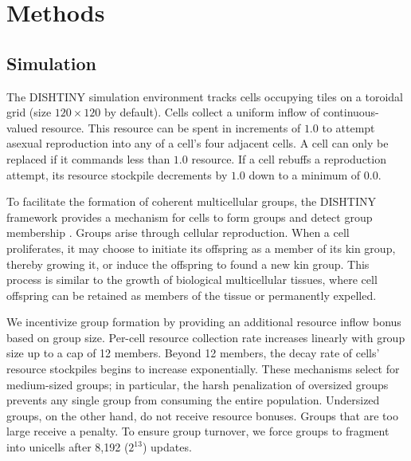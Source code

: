 



\section{Methods} \label{sec:methods;ch:measuring-cna}

\subsection{Simulation}



The DISHTINY simulation environment tracks cells occupying tiles on a toroidal grid (size $120\times120$ by default).
Cells collect a uniform inflow of continuous-valued resource.
This resource can be spent in increments of $1.0$ to attempt asexual reproduction into any of a cell's four adjacent cells.
A cell can only be replaced if it commands less than $1.0$ resource.
If a cell rebuffs a reproduction attempt, its resource stockpile decrements by $1.0$ down to a minimum of $0.0$.

To facilitate the formation of coherent multicellular groups, the DISHTINY framework provides a mechanism for cells to form groups and detect group membership .
Groups arise through cellular reproduction.
When a cell proliferates, it may choose to initiate its offspring as a member of its kin group, thereby growing it, or induce the offspring to found a new kin group.
This process is similar to the growth of biological multicellular tissues, where cell offspring can be retained as members of the tissue or permanently expelled.

We incentivize group formation by providing an additional resource inflow bonus based on group size.
Per-cell resource collection rate increases linearly with group size up to a cap of 12 members.
Beyond 12 members, the decay rate of cells' resource stockpiles begins to increase exponentially.
These mechanisms select for medium-sized groups; in particular, the harsh penalization of oversized groups prevents any single group from consuming the entire population.
Undersized groups, on the other hand, do not receive resource bonuses.
Groups that are too large receive a penalty.
To ensure group turnover, we force groups to fragment into unicells after 8,192 ($2^{13}$) updates.


